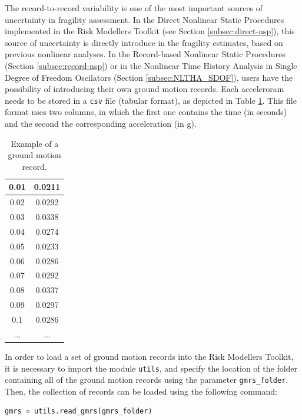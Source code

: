 The record-to-record variability is one of the most important sources of uncertainty in fragility assessment. In the Direct Nonlinear Static Procedures implemented in the Risk Modellers Toolkit (see Section \ref{subsec:direct-nsp}), this source of uncertainty is directly introduce in the fragility estimates, based on previous nonlinear analyses. In the Record-based Nonlinear Static Procedures (Section \ref{subsec:record-nsp}) or in the Nonlinear Time History Analysis in Single Degree of Freedom Oscilators (Section \ref{subsec:NLTHA_SDOF}), users have the possibility of introducing their own ground motion records. Each acceleroram needs to be stored in a \verb=csv= file (tabular format), as depicted in Table \ref{table:gmr}. This file format uses two columns, in which the first one contains the time (in seconds) and the second the corresponding acceleration (in g). \\

\begin {table}[htb]
\caption{Example of a ground motion record.}
\label{table:gmr}
\begin{center}
  \begin{tabular}{ | c | c |}
  \hline
0.01 & 0.0211 \\ \hline
0.02 & 0.0292 \\ \hline
0.03 & 0.0338 \\ \hline
0.04 & 0.0274 \\ \hline
0.05 & 0.0233 \\ \hline
0.06 & 0.0286 \\ \hline
0.07 & 0.0292 \\ \hline
0.08 & 0.0337 \\ \hline
0.09 & 0.0297 \\ \hline
0.1 & 0.0286 \\ \hline
... & ...  \\ \hline
  \end{tabular}
\end{center}
\end{table}

In order to load a set of ground motion records into the Risk Modellers Toolkit, it is necessary to import the module \verb=utils=, and specify the location of the folder containing all of the ground motion records using the parameter \verb=gmrs_folder=. Then, the collection of records can be loaded using the following command:

\begin{Verbatim}[frame=single, commandchars=\\\{\}, samepage=true]
gmrs = utils.read_gmrs(gmrs_folder)
\end{Verbatim}

